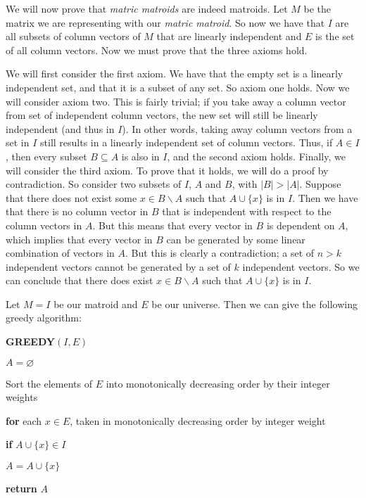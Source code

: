 \documentclass{article}
\begin{document}
\begin{description}
        \vspace{5mm}
        We will now prove that \textit{matric matroids} are indeed matroids. Let
        $M$ be the matrix we are representing with our \textit{matric matroid}.
        So now we have that $I$ are all subsets of column vectors of $M$ that are
        linearly independent and $E$ is the set of all column vectors. Now we must
        prove that the three axioms hold.

        We will first consider the first axiom. We have that the empty set
        is a linearly independent set, and that it is a subset of any set. So axiom
        one holds. Now we will consider axiom two. This is fairly trivial; if
        you take away a column vector from set of independent column vectors, the
        new set will
        still be linearly independent (and thus in $I$). In other words, taking
        away column vectors from a set in $I$ still results in a linearly independent
        set of column vectors. Thus, if $A \in I$, then every subset $B \subseteq A$ is
        also in $I$, and the second axiom holds. Finally, we will consider the
        third axiom. To prove that it holds, we will do a proof by
        contradiction. So consider two subsets of $I$, $A$ and $B$, with $|B| >
        |A|$. Suppose that there does not exist some $x \in B \backslash A$ such
        that $A \cup \{x\}$ is in $I$. Then we have that there is no column
        vector in $B$ that is independent with respect to the column vectors in
        $A$. But this means that every vector in $B$ is dependent on $A$, which
        implies that every vector in $B$ can be generated by some linear
        combination of vectors in $A$. But this is clearly a contradiction; a
        set of $n > k$ independent vectors cannot be generated by a set of $k$
        independent vectors. So we can conclude that there does exist $x \in B
        \backslash A$ such that $A \cup \{x\}$ is in $I$.
        \newpage
    \item[(b)]
        Let $M = I$ be our matroid and $E$ be our universe. Then we can give the
        following greedy algorithm:

        \vspace{5mm}
        \noindent \textbf{GREEDY}$(I,E)$
        \begin{enumerate}
            \item $A = \varnothing$
            \item Sort the elements of $E$ into monotonically decreasing order
                by their integer weights
            \item \textbf{for} each $x \in E$, taken in monotonically decreasing
                order by integer weight
            {\setlength\itemindent{25pt} \item \textbf{if} $A \cup \{x\} \in
            I$ }
            {\setlength\itemindent{50pt} \item $A = A \cup \{x\}$ }
            \item \textbf{return} $A$
        \end{enumerate}


\end{description}
\end{document}
